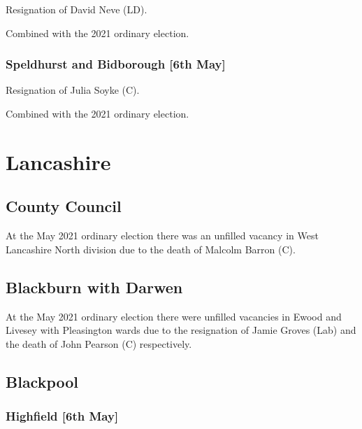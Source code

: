 \documentclass[a4paper,openany]{book}
\begin{document}
\begin{resultsiii}

Resignation of David Neve (LD).

Combined with the 2021 ordinary election.

\subsubsection*{Speldhurst and Bidborough \hspace*{\fill}\nolinebreak[1]%
	\enspace\hspace*{\fill}
	[6th May]}


Resignation of Julia Soyke (C).

Combined with the 2021 ordinary election.

\section{Lancashire}

\subsection*{County Council}

At the May 2021 ordinary election there was an unfilled vacancy in West Lancashire North division due to the death of Malcolm Barron (C).

\subsection*{Blackburn with Darwen}

At the May 2021 ordinary election there were unfilled vacancies in Ewood and Livesey with Pleasington wards due to the resignation of Jamie Groves (Lab) and the death of John Pearson (C) respectively.%
%

\subsection*{Blackpool}

\subsubsection*{Highfield \hspace*{\fill}\nolinebreak[1]%
	\enspace\hspace*{\fill}
	[6th May]}


\end{resultsiii}
\end{document}
